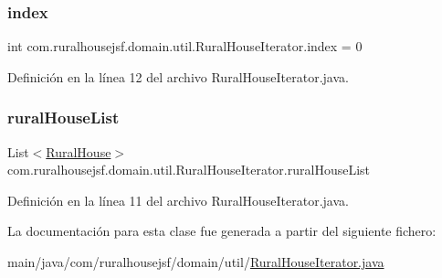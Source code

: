 \subsubsection{\texorpdfstring{index}{index}}
{\footnotesize\ttfamily int com.\+ruralhousejsf.\+domain.\+util.\+Rural\+House\+Iterator.\+index = 0\hspace{0.3cm}{\ttfamily [private]}}



Definición en la línea 12 del archivo Rural\+House\+Iterator.\+java.

\mbox{\label{classcom_1_1ruralhousejsf_1_1domain_1_1util_1_1_rural_house_iterator_a86506cdc509d2a232309bdcf939f4d51}} 
\subsubsection{\texorpdfstring{ruralHouseList}{ruralHouseList}}
{\footnotesize\ttfamily List$<$\mbox{\hyperlink{classcom_1_1ruralhousejsf_1_1domain_1_1_rural_house}{Rural\+House}}$>$ com.\+ruralhousejsf.\+domain.\+util.\+Rural\+House\+Iterator.\+rural\+House\+List\hspace{0.3cm}{\ttfamily [private]}}



Definición en la línea 11 del archivo Rural\+House\+Iterator.\+java.



La documentación para esta clase fue generada a partir del siguiente fichero\+:\begin{DoxyCompactItemize}
\item 
main/java/com/ruralhousejsf/domain/util/\mbox{\hyperlink{_rural_house_iterator_8java}{Rural\+House\+Iterator.\+java}}\end{DoxyCompactItemize}
